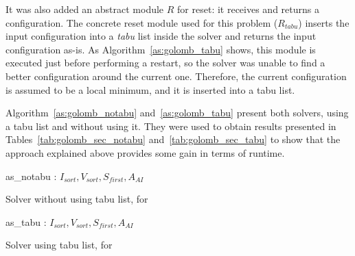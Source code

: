 It was also added an abstract module $R$ for reset: it receives and returns a configuration. The concrete reset module used for this problem ($R_{tabu}$) inserts the input configuration into a \textit{tabu} list inside the solver and returns the input configuration as-is. As Algorithm~\ref{as:golomb_tabu} shows, this module is executed just before performing a restart, so the solver was unable to find a better configuration around the current one. Therefore, the current configuration is assumed to be a local minimum, and it is inserted into a tabu list.

Algorithm~\ref{as:golomb_notabu} and~\ref{as:golomb_tabu} present both solvers, using a tabu list and without using it. They were used to obtain results presented in Tables~\ref{tab:golomb_sec_notabu} and~\ref{tab:golomb_sec_tabu} to show that the approach explained above provides some gain in terms of runtime. 

\begin{algorithm}[H]
\dontprintsemicolon
\SetNoline
{}
   as\_notabu\;
\algoindent {} : $I_{sort}, V_{sort}, S_{first}, A_{AI}$ \;
\caption{Solver without using tabu list, for \GRP}\label{as:golomb_notabu}
\end{algorithm}

\begin{algorithm}[H]
\dontprintsemicolon
\SetNoline
{}
   as\_tabu\;
\algoindent {} : $I_{sort}, V_{sort}, S_{first}, A_{AI}$ \;
\caption{Solver using tabu list, for \GRP}\label{as:golomb_tabu}
\end{algorithm}


